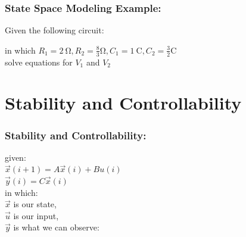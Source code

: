 \documentclass{beamer}
\begin{document}




\begin{frame}
\frametitle{State Space Modeling Example:}

Given the following circuit: 


in which $R_{1} = \SI{2}{\ohm}, R_{2} = \frac{8}{3} \si{\ohm}, C_{1} = \SI{1}{\coulomb}, C_{2} = \frac{3}{2} \si{\coulomb} $ \\
solve equations for $V_{1}$ and $V_{2}$
\end{frame}

\section[S\&C]{Stability and Controllability}

\begin{frame}
\frametitle{Stability and Controllability:}

given: \\ 
$\vec{x}(i+1) = A\vec{x}(i) + Bu(i)$ \\
$\vec{y}(i) = C\vec{x}(i)$ \\
in which: \\
$\vec{x}$ is our state, \\
$\vec{u}$ is our input, \\
$\vec{y}$ is what we can observe: \\
\end{frame}
\end{document}
